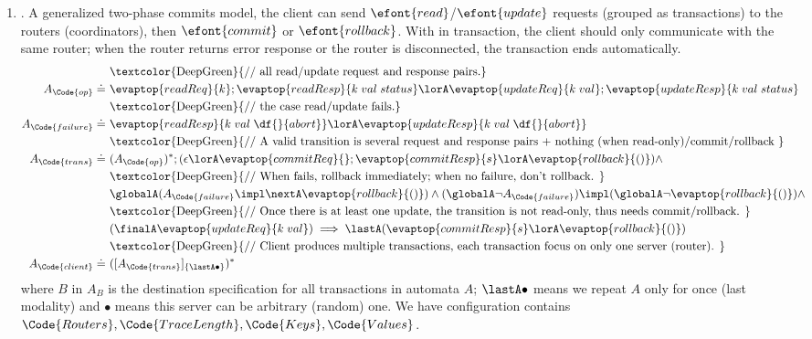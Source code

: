 \begin{enumerate}
    \item {}. A generalized two-phase commits model, the client can send $\efont{read}$/$\efont{update}$ requests (grouped as transactions) to the routers (coordinators), then $\efont{commit}$ or $\efont{rollback}$. With in transaction, the client should only communicate with the same router; when the router returns error response or the router is disconnected, the transaction ends automatically.
{\small
    \begin{align*}
        &\ \text{\textcolor{DeepGreen}{// all read/update request and response pairs.}}
        \\A_\Code{op} \doteq&\ \evaptop{readReq}{k};\evaptop{readResp}{k\;val\;status}\lorA \evaptop{updateReq}{k\; val};\evaptop{updateResp}{k\;val\;status}
       \\&\ \text{\textcolor{DeepGreen}{// the case read/update fails.}}
        \\A_\Code{failure} \doteq&\ \evaptop{readResp}{k\;val\;\df{}{abort}} \lorA \evaptop{updateResp}{k\;val\;\df{}{abort}}
         \\&\ \text{\textcolor{DeepGreen}{// A valid transition is several request and response pairs + nothing (when read-only)/commit/rollback }}
        \\A_\Code{trans} \doteq&\ (A_\Code{op})^*; (\epsilon \lorA \evaptop{commitReq}{};\evaptop{commitResp}{s} \lorA \evaptop{rollback}{()})  \land
        \\&\ \text{\textcolor{DeepGreen}{// When fails, rollback immediately; when no failure, don't rollback. }}
        \\&\ \globalA (A_\Code{failure}\impl\nextA \evaptop{rollback}{()}) \land (\globalA \neg A_\Code{failure})\impl 
        (\globalA \neg \evaptop{rollback}{()}) \land
        \\&\ \text{\textcolor{DeepGreen}{// Once there is at least one update, the transition is not read-only, thus needs commit/rollback. }}
        \\&\ (\finalA \evaptop{updateReq}{k\;val}) \implies \lastA (\evaptop{commitResp}{s} \lorA \evaptop{rollback}{()})
         \\&\ \text{\textcolor{DeepGreen}{// Client produces multiple transactions, each transaction focus on only one server (router). }}
        \\A_\Code{client} \doteq&\ ([A_\Code{trans}]_{\{\lastA \bullet\}})^*
    \end{align*}}\noindent
    where $B$ in $A_{B}$ is the destination specification for all transactions in automata $A$; $\lastA \bullet$ means we repeat $A$ only for once (last modality) and $\bullet$ means this server can be arbitrary (random) one. We have configuration contains $\Code{Routers}, \Code{TraceLength}, \Code{Keys}, \Code{Values}$.

\end{enumerate}
